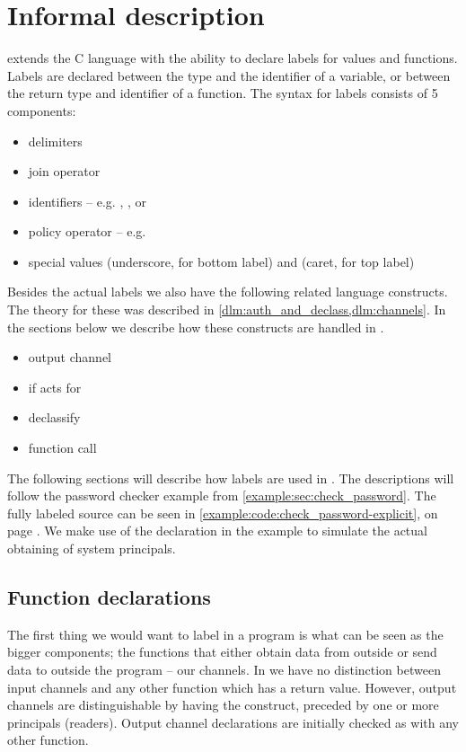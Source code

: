 \section{Informal description}\label{ctif:informal}
\thelang{} extends the C language with the ability to declare labels for values and functions.
Labels are declared between the type and the identifier of a variable, or between the return type and identifier of a function.
The syntax for labels consists of 5 components:
\begin{itemize}
  \item delimiters \dlmc{\{\{ \}\}}
  \item join operator \dlmc{;}
  \item identifiers -- e.g. , , or 
  \item policy operator \dlmc{->} -- e.g. 
  \item special values \dlmc{_} (underscore, for bottom label) and \dlmc{^} (caret, for top label)
\end{itemize}

Besides the actual labels we also have the following related language constructs.
The theory for these was described in \cref{dlm:auth_and_declass,dlm:channels}.
In the sections below we describe how these constructs are handled in \thelang.

\begin{itemize}
  \item output channel 
  \item if acts for 
  \item declassify 
  \item function call 
\end{itemize}

The following sections will describe how labels are used in \thelang.
The descriptions will follow the password checker example from \cref{example:sec:check_password}.
The fully labeled source can be seen in \cref{example:code:check_password-explicit}, on page \pageref{example:code:check_password-explicit}.
We make use of the  declaration in the example to simulate the actual obtaining of system principals.

\subsection{Function declarations}
The first thing we would want to label in a program is what can be seen as the bigger components; the functions that either obtain data from outside or send data to outside the program -- our channels.
In \thelang{} we have no distinction between input channels and any other function which has a return value.
However, output channels are distinguishable by having the \dlmc{<-} construct, preceded by one or more principals (readers).
Output channel declarations are initially checked as with any other function.

